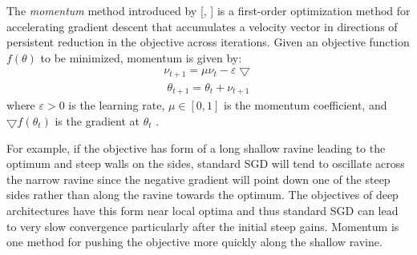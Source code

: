 The \textit{momentum} method introduced by [\citeauthor{polyak1964some}, \citeyear{polyak1964some}] is a first-order optimization method for accelerating gradient descent that accumulates a velocity vector in directions of persistent reduction in the objective across iterations. Given an objective function $f(\theta)$ to be minimized, momentum is given by:
\begin{equation}
	\label{eq:t}
	\begin{aligned}
		\nu_{t+1} = \mu\nu_t - \varepsilon\bigtriangledown 
	\end{aligned}
\end{equation}
\begin{equation}
	\label{eq:t}
	\begin{gathered}
	\theta_{t+1} = \theta_t + \nu_{t + 1}
	\end{gathered}
\end{equation}
where $\varepsilon > 0$ is the learning rate, $\mu \in [0,1]$ is the momentum coefficient, and $\bigtriangledown f(\theta_t)$ is the gradient at $\theta_t$ \cite{sutskever2013importance}. 

For example, if the objective has form of a long shallow ravine leading to the optimum and steep walls on the sides, standard SGD will tend to oscillate across the narrow ravine since the negative gradient will point down one of the steep sides rather than along the ravine towards the optimum. The objectives of deep architectures have this form near local optima and thus standard SGD can lead to very slow convergence particularly after the initial steep gains. Momentum is one method for pushing the objective more quickly along the shallow ravine\cite{sgd}. 





